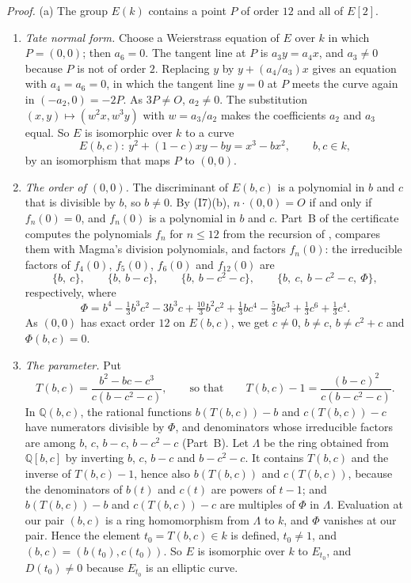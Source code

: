 \documentclass[11pt]{article}
\newcommand{\Q}{\mathbb Q}
\begin{document}
\emph{Proof.} (a) The group \(E(k)\) contains a point \(P\) of order \(12\) and all of \(E[2]\).
\begin{enumerate}
\item \emph{Tate normal form.} Choose a Weierstrass equation of \(E\) over \(k\) in which \(P=(0,0)\); then
\(a_6=0\). The tangent line at \(P\) is \(a_3y=a_4x\), and \(a_3\neq0\) because \(P\) is not of order \(2\).
Replacing \(y\) by \(y+(a_4/a_3)x\) gives an equation with \(a_4=a_6=0\), in which the tangent line \(y=0\) at
\(P\) meets the curve again in \((-a_2,0)=-2P\). As \(3P\neq O\), \(a_2\neq0\). The substitution
\((x,y)\mapsto(w^2x,w^3y)\) with \(w=a_3/a_2\) makes the coefficients \(a_2\) and \(a_3\) equal. So \(E\) is
isomorphic over \(k\) to a curve
\[E(b,c)\colon\ y^2+(1-c)xy-by=x^3-bx^2,\qquad b,c\in k,\]
by an isomorphism that maps \(P\) to \((0,0)\).

\item \emph{The order of \((0,0)\).} The discriminant of \(E(b,c)\) is a polynomial in \(b\) and \(c\) that is
divisible by \(b\), so \(b\neq0\). By (I7)(b), \(n\cdot(0,0)=O\) if and only if \(f_n(0)=0\), and \(f_n(0)\) is
a polynomial in \(b\) and \(c\). Part~B of the certificate computes the polynomials \(f_n\) for \(n\le12\) from
the recursion of \cite[Exercise~III.3.7]{Si1}, compares them with Magma's division polynomials, and factors
\(f_n(0)\): the irreducible factors of \(f_4(0)\), \(f_5(0)\), \(f_6(0)\) and \(f_{12}(0)\) are
\[\{b,\ c\},\qquad\{b,\ b-c\},\qquad\{b,\ b-c^2-c\},\qquad\{b,\ c,\ b-c^2-c,\ \Phi\},\]
respectively, where
\[\Phi=b^4-\tfrac13b^3c^2-3b^3c+\tfrac{10}3b^2c^2+\tfrac13bc^4-\tfrac53bc^3+\tfrac13c^6+\tfrac13c^4.\]
As \((0,0)\) has exact order \(12\) on \(E(b,c)\), we get \(c\neq0\), \(b\neq c\), \(b\neq c^2+c\) and
\(\Phi(b,c)=0\).

\item \emph{The parameter.} Put
\[T(b,c)=\frac{b^2-bc-c^3}{c(b-c^2-c)},\qquad\text{so that}\qquad T(b,c)-1=\frac{(b-c)^2}{c(b-c^2-c)}.\]
In \(\Q(b,c)\), the rational functions \(b(T(b,c))-b\) and \(c(T(b,c))-c\) have numerators divisible by \(\Phi\),
and denominators whose irreducible factors are among \(b\), \(c\), \(b-c\), \(b-c^2-c\) (Part~B). Let \(\Lambda\) be the
ring obtained from \(\Q[b,c]\) by inverting \(b\), \(c\), \(b-c\) and \(b-c^2-c\). It contains \(T(b,c)\) and the
inverse of \(T(b,c)-1\), hence also \(b(T(b,c))\) and \(c(T(b,c))\), because the denominators of \(b(t)\) and
\(c(t)\) are powers of \(t-1\); and \(b(T(b,c))-b\) and \(c(T(b,c))-c\) are multiples of \(\Phi\) in \(\Lambda\).
Evaluation at our pair \((b,c)\) is a ring homomorphism from \(\Lambda\) to \(k\), and \(\Phi\) vanishes at our pair.
Hence the element \(t_0=T(b,c)\in k\) is defined, \(t_0\neq1\), and \((b,c)=(b(t_0),c(t_0))\). So \(E\)
is isomorphic over \(k\) to \(E_{t_0}\), and \(D(t_0)\neq0\) because \(E_{t_0}\) is an elliptic curve.


\end{enumerate}
\end{document}

